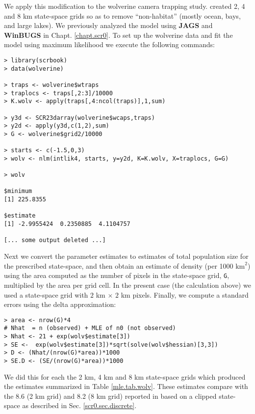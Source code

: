 We apply this modification to the wolverine camera trapping
study. \citet{royle_etal:2011jwm} created 2, 4 and 8 km state-space
grids so as to remove ``non-habitat'' (mostly ocean, bays, and large
lakes). We previously analyzed the model using {\bf JAGS} and {\bf WinBUGS} in
Chapt. \ref{chapt.scr0}.  To set up the wolverine data and fit the
model using maximum likelihood 
we execute the following commands:
{\small 
\begin{verbatim}
> library(scrbook)
> data(wolverine)

> traps <- wolverine$wtraps
> traplocs <- traps[,2:3]/10000
> K.wolv <- apply(traps[,4:ncol(traps)],1,sum)

> y3d <- SCR23darray(wolverine$wcaps,traps)
> y2d <- apply(y3d,c(1,2),sum)
> G <- wolverine$grid2/10000

> starts <- c(-1.5,0,3)
> wolv <- nlm(intlik4, starts, y=y2d, K=K.wolv, X=traplocs, G=G)

> wolv

$minimum
[1] 225.8355

$estimate
[1] -2.9955424  0.2350885  4.1104757

[... some output deleted ...]
\end{verbatim}
}

Next we convert the parameter estimates to estimates of total
population size for the prescribed state-space, and then obtain an
estimate of density (per 1000
$\text{km}^2$) using the area computed as the number of pixels in the
state-space grid, \mbox{\tt G}, multiplied by the area per grid cell. In
the present case (the calculation above) we used a state-space grid
with $2$ km $\times$ $2$ km pixels.  Finally, we compute
a standard errors using the delta approximation: 
\begin{verbatim}
> area <- nrow(G)*4
# Nhat  = n (observed) + MLE of n0 (not observed)
> Nhat <- 21 + exp(wolv$estimate[3])
> SE <-  exp(wolv$estimate[3])*sqrt(solve(wolv$hessian)[3,3])
> D <- (Nhat/(nrow(G)*area))*1000
> SE.D <- (SE/(nrow(G)*area))*1000
\end{verbatim}
We did this for each the 2 km, 4 km and 8 km state-space grids
which produced the estimates summarized in Table \ref{mle.tab.wolv}.
These estimates compare with the 8.6 (2 km grid) and 8.2 (8 km grid)
reported in 
\citet{royle_etal:2011jwm} based on a clipped state-space as described
in Sec. \ref{scr0.sec.discrete}.

